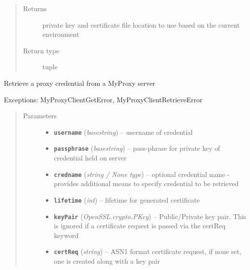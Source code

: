 \documentclass[letterpaper,10pt,english]{sphinxmanual}
\begin{document}
\begin{fulllineitems}
\begin{fulllineitems}
\begin{quote}
\begin{description}
\item[{Returns}] \leavevmode
private key and certificate file location to use based on the current environment

\item[{Return type}] \leavevmode
tuple

\end{description}\end{quote}

\end{fulllineitems}


\begin{fulllineitems}
\label{client:myproxy.client.MyProxyClient.logon}
Retrieve a proxy credential from a MyProxy server

Exceptions:  MyProxyClientGetError, MyProxyClientRetrieveError
\begin{quote}\begin{description}
\item[{Parameters}] \leavevmode\begin{itemize}
\item {} 
\textbf{\texttt{username}} (\emph{basestring}) -- username of credential

\item {} 
\textbf{\texttt{passphrase}} (\emph{basestring}) -- pass-phrase for private key of credential held on server

\item {} 
\textbf{\texttt{credname}} (\emph{string / None type}) -- optional credential name - provides additional means         to specify credential to be retrieved

\item {} 
\textbf{\texttt{lifetime}} (\emph{int}) -- lifetime for generated certificate

\item {} 
\textbf{\texttt{keyPair}} (\emph{OpenSSL.crypto.PKey}) -- Public/Private key pair.  This is ignored if a         certificate request is passed via the certReq keyword

\item {} 
\textbf{\texttt{certReq}} (\emph{string}) -- ASN1 format certificate request, if none set, one is         created along with a key pair


\end{itemize}
\end{description}
\end{quote}
\end{fulllineitems}
\end{fulllineitems}
\end{document}
